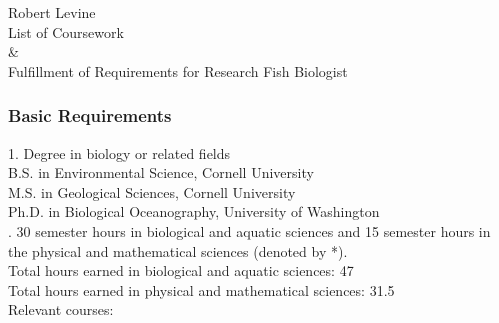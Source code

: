 \documentclass[12pt,a4paper]{article}
\begin{document}
\begin{center}
{\Large Robert Levine} 
\medskip\\
List of Coursework\\ \& \\ Fulfillment of Requirements for Research Fish Biologist
\end{center}
\subsubsection*{Basic Requirements}

1. Degree in biology or related fields
\medskip\\ B.S. in Environmental Science, Cornell University\\
M.S. in Geological Sciences, Cornell University\\
Ph.D. in Biological Oceanography, University of Washington\\

. 30 semester hours in biological and aquatic sciences %
and 15 semester hours in the physical and mathematical sciences (denoted by *).
\medskip\\Total hours earned in biological and aquatic sciences: 47\\
Total hours earned in physical and mathematical sciences: 31.5\\
Relevant courses:\\

\end{document}
